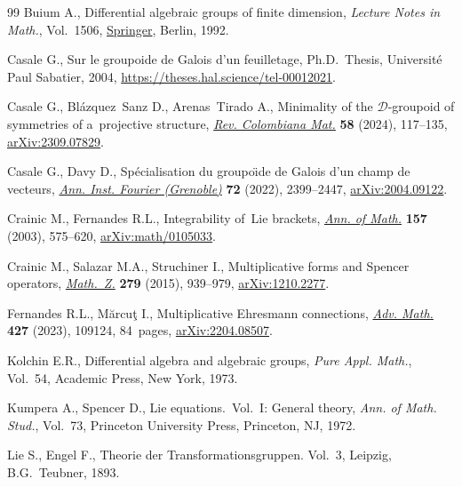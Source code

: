\documentclass[pdftex]{sigma}
\numberwithin{equation}{section}
\theoremstyle{definition}
\begin{document}
\begin{thebibliography}{99}
Buium A., Differential algebraic groups of finite dimension, \textit{Lecture
 Notes in Math.}, Vol.~1506,
 \href{https://doi.org/10.1007/BFb0087235}{Springer}, Berlin, 1992.

Casale G., Sur le groupoide de Galois d'un feuilletage, Ph.D.~Thesis,
 {U}niversit\'e Paul Sabatier, 2004,
 \url{https://theses.hal.science/tel-00012021}.

Casale G., Bl\'azquez~Sanz D., Arenas~Tirado A., Minimality of the {$\mathcal
 D$}-groupoid of symmetries of a~projective structure,
 \href{https://doi.org/10.15446/recolma.v58n2.121031}{\textit{Rev. Colombiana
 Mat.}} \textbf{58} (2024), 117--135,
 \href{https://arxiv.org/abs/2309.07829}{arXiv:2309.07829}.

Casale G., Davy D., Sp\'ecialisation du groupo\"{\i}de de {G}alois d'un champ
 de vecteurs, \href{https://doi.org/10.5802/aif.3506}{\textit{Ann. Inst.
 Fourier (Grenoble)}} \textbf{72} (2022), 2399--2447,
 \href{https://arxiv.org/abs/2004.09122}{arXiv:2004.09122}.

Crainic M., Fernandes R.L., Integrability of~{L}ie brackets,
 \href{https://doi.org/10.4007/annals.2003.157.575}{\textit{Ann. of Math.}}
 \textbf{157} (2003), 575--620,
 \href{https://arxiv.org/abs/math/0105033}{arXiv:math/0105033}.

Crainic M., Salazar M.A., Struchiner I., Multiplicative forms and {S}pencer
 operators,
 \href{https://doi.org/10.1007/s00209-014-1398-z}{\textit{Math.~Z.}}
 \textbf{279} (2015), 939--979,
 \href{https://arxiv.org/abs/1210.2277}{arXiv:1210.2277}.

Fernandes R.L., M\u{a}rcu\c{t} I., Multiplicative {E}hresmann connections,
 \href{https://doi.org/10.1016/j.aim.2023.109124}{\textit{Adv. Math.}}
 \textbf{427} (2023), 109124, 84~pages,
 \href{https://arxiv.org/abs/2204.08507}{arXiv:2204.08507}.

Kolchin E.R., Differential algebra and algebraic groups, \textit{Pure Appl.
 Math.}, Vol.~54, Academic Press, New York, 1973.

Kumpera A., Spencer D., Lie equations.~{V}ol.~{I}: {G}eneral theory,
 \textit{Ann. of Math. Stud.}, Vol.~73, Princeton University Press, Princeton,
 NJ, 1972.

Lie S., Engel F., Theorie der {T}ransformationsgruppen. Vol.~3, Leipzig,
 B.G.~Teubner, 1893.


\end{thebibliography}
\end{document}
